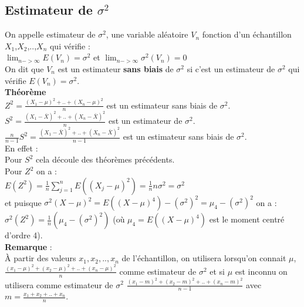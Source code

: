 \documentclass[a4paper,11pt]{book}
\begin{document}
\subsection{Estimateur de $\sigma^2$}\label{sec:estims}
On appelle estimateur de $\sigma^2$, une variable al\'eatoire $V_n$ fonction 
d'un \'echantillon $X_1$,$X_2$,..,$X_n$ qui v\'erifie :\\
$\lim_{n->\infty} E(V_n)=\sigma^2$ et $\lim_{n->\infty}\sigma^2(V_n)=0$\\
On dit que $V_n$ est un  estimateur {\bf sans biais} de $\sigma^2$ si c'est un
estimateur de $\sigma^2$ qui v\'erifie $E(V_n)=\sigma^2$.\\ 
{\bf Th\'eor\`eme}\\
$\displaystyle Z^2=\frac{(X_1-\mu)^2+..+(X_n-\mu)^2}{n}$
 est un  estimateur sans biais de $\sigma^2$.\\
 $\displaystyle S^2=\frac{(X_1-\bar X)^2+..+(X_n-\bar X)^2}{n}$ est un  
estimateur de $\sigma^2$.\\ 
 $\displaystyle \frac{n}{n-1}S^2=\frac{(X_1-\bar X)^2+..+(X_n-\bar X)^2}{n-1}$ 
est un  estimateur sans biais 
de $\sigma^2$.\\
En effet :\\
Pour $S^2$ cela d\'ecoule des th\'eor\`emes pr\'ec\'edents.\\
 Pour $Z^2$ on a :\\
$E(Z^2)=\frac{1}{n}\sum_{j=1}^n E((X_j-\mu)^2)=\frac{1}{n}n\sigma^2=\sigma^2$\\
et puisque $\sigma^2(X-\mu)^2=E((X-\mu)^4)-(\sigma^2)^2=\mu_4-(\sigma^2)^2$ 
on a :\\
$\sigma^2(Z^2)=\frac{1}{n}(\mu_4-(\sigma^2)^2)$ (o\`u $\mu_4=E((X-\mu)^4)$ est 
le moment centr\'e d'ordre 4).\\
{\bf Remarque} :\\
\`A partir des valeurs $x_1,x_2,..,x_n$ de l'\'echantillon, on utilisera 
lorsqu'on connait $\mu$,  $\displaystyle \frac{(x_1-\mu)^2+(x_2-\mu)^2+..+(x_n-\mu)^2}{n}$ 
comme estimateur de $\sigma^2$ et si $\mu$ est inconnu on utilisera comme 
estimateur de $\sigma^2$
$\displaystyle \frac{(x_1-m)^2+(x_2-m)^2+..+(x_n-m)^2}{n-1}$ avec
$\displaystyle m=\frac{x_1+x_2+..+x_n}{n}$. 
\end{document}
